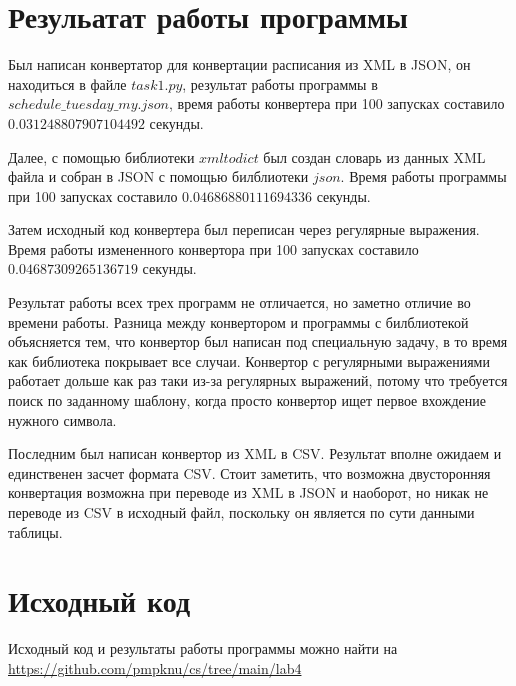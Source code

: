 \section{Резульатат работы программы}

Был написан конвертатор для конвертации расписания из XML в JSON, он находиться в файле $task1.py$, результат работы программы в $schedule\_tuesday\_my.json$, время работы конвертера при 100 запусках составило $0.031248807907104492$ секунды.


Далее, с помощью библиотеки $xmltodict$ был создан словарь из данных XML файла и собран в JSON с помощью билблиотеки $json$. Время работы программы при 100 запусках составило $0.04686880111694336$ секунды.


Затем исходный код конвертера был переписан через регулярные выражения. Время работы измененного конвертора при 100 запусках составило $0.04687309265136719$ секунды.


Результат работы всех трех программ не отличается, но заметно отличие во времени работы. Разница между конвертором и программы с билблиотекой объясняется тем, что конвертор был написан под специальную задачу, в то время как библиотека покрывает все случаи. Конвертор с регулярными выражениями работает дольше как раз таки из-за регулярных выражений, потому что требуется поиск по заданному шаблону, когда просто конвертор ищет первое вхождение нужного символа.

Последним был написан конвертор из XML в CSV. Результат вполне ожидаем и единственен засчет формата CSV. Стоит заметить, что возможна двусторонняя конвертация возможна при переводе из XML в JSON и наоборот, но никак не переводе из CSV в исходный файл, поскольку он является по сути данными таблицы.

\clearpage
\section{Исходный код}
Исходный код и результаты работы программы можно найти на\\ \url{https://github.com/pmpknu/cs/tree/main/lab4}
